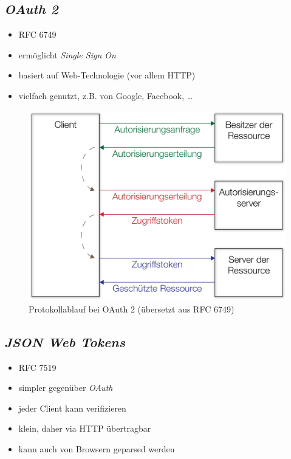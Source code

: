 \documentclass{beamer}
\begin{document}
\subsection{\em OAuth 2}
\begin{frame}{\insertsubsection}
	\begin{itemize}
		\item RFC 6749 \cite{RFC6749}
		\item ermöglicht \textit{Single Sign On}
		\item basiert auf Web-Technologie (vor allem HTTP)
		\item vielfach genutzt, z.B. von Google, Facebook, …
	\end{itemize}
\end{frame}	

\begin{frame}{\insertsubsection}
	\begin{figure}
		\centering
		\includegraphics[width=.52\linewidth]{img/OAuth2}
		\caption{Protokollablauf bei OAuth 2 (übersetzt aus RFC 6749)}
	\end{figure}
\end{frame}
	
\subsection{\em JSON Web Tokens}
\begin{frame}{\insertsubsection}
	\begin{itemize}
		\item RFC 7519 \cite{RFC7519}
		\item simpler gegenüber \textit{OAuth}
		\item jeder Client kann verifizieren
		\item klein, daher via HTTP übertragbar
		\item kann auch von Browsern geparsed werden
	\end{itemize}
\end{frame}
	
\end{document}
